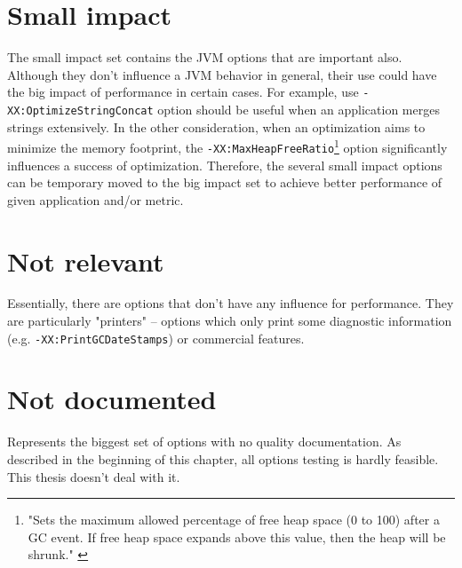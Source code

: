 \documentclass[
  digital, %
  oneside,
  notable, %
  nolof,     %
  nolot     %
]{fithesis3}
\begin{document}
\section{Small impact}
The small impact set contains the JVM options that are important also. Although they don't influence a JVM behavior in general, their use could have the big impact of performance in certain cases. For example, use \texttt{-XX:OptimizeStringConcat} option should be useful when an application merges strings extensively. In the other consideration, when an optimization aims to minimize the memory footprint, the \texttt{-XX:MaxHeapFreeRatio}\footnote{"Sets the maximum allowed percentage of free heap space (0 to 100) after a GC event. If free heap space expands above this value, then the heap will be shrunk." \cite{java}} option significantly influences a success of optimization.
Therefore, the several small impact options can be temporary moved to the big impact set to achieve better performance of given application and/or metric.

\section{Not relevant}
Essentially, there are options that don't have any influence for performance. They are particularly "printers" -- options which only print some diagnostic information (e.g. \texttt{-XX:PrintGCDateStamps}) or commercial features.

\section{Not documented}
Represents the biggest set of options with no quality documentation. As described in the beginning of this chapter, all options testing is hardly feasible. This thesis doesn't deal with it.
\end{document}
